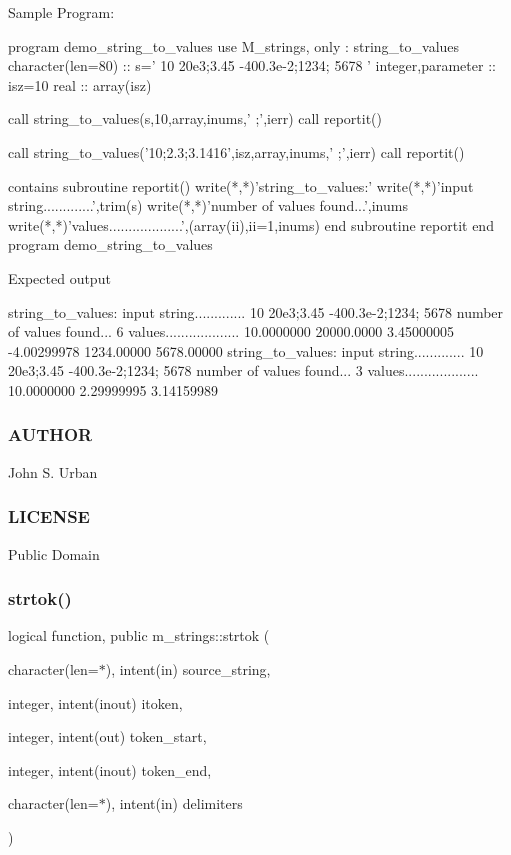 Sample Program\+: \begin{DoxyVerb}  program demo_string_to_values
   use M_strings, only : string_to_values
   character(len=80)  :: s=' 10 20e3;3.45 -400.3e-2;1234; 5678 '
   integer,parameter  :: isz=10
   real               :: array(isz)

   call string_to_values(s,10,array,inums,' ;',ierr)
   call reportit()

   call string_to_values('10;2.3;3.1416',isz,array,inums,' ;',ierr)
   call reportit()

   contains
      subroutine reportit()
         write(*,*)'string_to_values:'
         write(*,*)'input string.............',trim(s)
         write(*,*)'number of values found...',inums
         write(*,*)'values...................',(array(ii),ii=1,inums)
      end subroutine reportit
  end program demo_string_to_values
\end{DoxyVerb}


Expected output \begin{DoxyVerb}string_to_values:
input string............. 10 20e3;3.45 -400.3e-2;1234; 5678
number of values found...           6
values...................   10.0000000  20000.0000  3.45000005  -4.00299978  1234.00000  5678.00000
string_to_values:
input string............. 10 20e3;3.45 -400.3e-2;1234; 5678
number of values found...           3
values...................   10.0000000  2.29999995  3.14159989
\end{DoxyVerb}
 \subsubsection*{A\+U\+T\+H\+OR}

John S. Urban \subsubsection*{L\+I\+C\+E\+N\+SE}

Public Domain \mbox{\label{namespacem__strings_aa53af9135873e241c487a75a7073bda1}} 
\subsubsection{\texorpdfstring{strtok()}{strtok()}}
{\footnotesize\ttfamily logical function, public m\+\_\+strings\+::strtok (\begin{DoxyParamCaption}\item[{character(len=$\ast$), intent(in)}]{source\+\_\+string,  }\item[{integer, intent(inout)}]{itoken,  }\item[{integer, intent(out)}]{token\+\_\+start,  }\item[{integer, intent(inout)}]{token\+\_\+end,  }\item[{character(len=$\ast$), intent(in)}]{delimiters }\end{DoxyParamCaption})}



